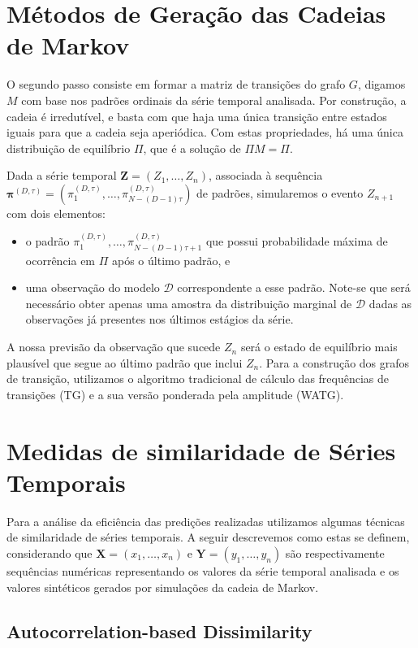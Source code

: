 \documentclass[10pt]{article}
\begin{document}
\section*{Métodos de Geração das Cadeias de Markov} \label{markov}

O segundo passo consiste em formar a matriz de transições do grafo $G$, digamos $M$ com base nos padrões ordinais da série temporal analisada.
Por construção, a cadeia é irredutível, e basta com que haja uma única transição entre estados iguais para que a cadeia seja aperiódica.
Com estas propriedades, há uma única distribuição de equilíbrio $\Pi$, que é a solução de $\Pi M=\Pi$.

Dada a série temporal $\bm Z=(Z_1,\dots,Z_n)$, associada à sequência $\bm \pi^{(D,\tau)} = (\pi^{(D,\tau)}_1,\dots,\pi^{(D,\tau)}_{N-(D-1)\tau})$ de padrões, simularemos o evento $Z_{n+1}$ com dois elementos:
\begin{itemize}
	\item o padrão $\pi^{(D,\tau)}_1,\dots,\pi^{(D,\tau)}_{N-(D-1)\tau+1}$ que possui probabilidade máxima de ocorrência em $\Pi$ após o último padrão, e
	\item uma observação do modelo $\mathcal D$ correspondente a esse padrão. Note-se que será necessário obter apenas uma amostra da distribuição marginal de $\mathcal D$ dadas as observações já presentes nos últimos estágios da série.
\end{itemize} 

A nossa previsão da observação que sucede $Z_n$ será o estado de equilíbrio mais plausível que segue ao último padrão que inclui $Z_n$.
Para a construção dos grafos de transição, utilizamos o algoritmo tradicional de cálculo das frequências de transições (TG) e a sua versão ponderada pela amplitude (WATG).

\section*{Medidas de similaridade de Séries Temporais} \label{similarity}

Para a análise da eficiência das predições realizadas utilizamos algumas técnicas de similaridade de séries temporais.
A seguir descrevemos como estas se definem, considerando que $\bm X = (x_1, \dots, x_n)$  e $\bm Y = (y_1, \dots, y_n)$ são respectivamente sequências numéricas representando os valores da série temporal analisada e os valores sintéticos gerados por simulações da cadeia de Markov.

\subsection*{Autocorrelation-based Dissimilarity} \label{ACF}
\end{document}
